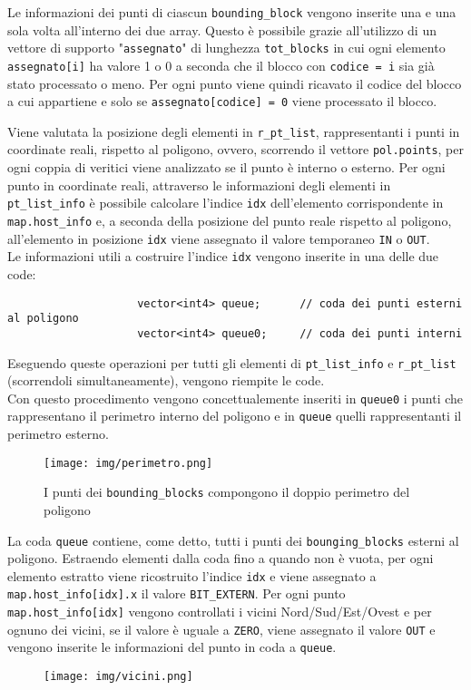 				Le informazioni dei punti di ciascun \texttt{bounding\_block} vengono inserite una e una sola volta all'interno dei due array. Questo \`{e} possibile grazie all'utilizzo di un vettore di supporto "\texttt{assegnato}" di lunghezza \texttt{tot\_blocks} in cui ogni elemento \texttt{assegnato[i]} ha valore 1 o 0 a seconda che il blocco con \texttt{codice = i} sia gi\`{a} stato processato o meno.
				Per ogni punto viene quindi ricavato il codice del blocco a cui appartiene e solo se \texttt{assegnato[codice] = 0} viene processato il blocco.

				Viene valutata la posizione degli elementi in \texttt{r\_pt\_list}, rappresentanti i punti in coordinate reali, rispetto al poligono, ovvero, scorrendo il vettore \texttt{pol.points}, per ogni coppia di veritici viene analizzato se il punto \`{e} interno o esterno. Per ogni punto in coordinate reali, attraverso le informazioni degli elementi in \texttt{pt\_list\_info} \`{e} possibile calcolare l'indice \texttt{idx} dell'elemento corrispondente in \texttt{map.host\_info} e, a seconda della  posizione del punto reale rispetto al poligono, all'elemento in posizione \texttt{idx} viene assegnato il valore temporaneo \texttt{IN} o \texttt{OUT}.\\
				Le informazioni utili a costruire l'indice \texttt{idx} vengono inserite in una delle due code:
				\begin{verbatim}
					vector<int4> queue;      // coda dei punti esterni al poligono
					vector<int4> queue0;     // coda dei punti interni
				\end{verbatim} 
				Eseguendo queste operazioni per tutti gli elementi di \texttt{pt\_list\_info} e \texttt{r\_pt\_list} (scorrendoli simultaneamente), vengono riempite le code.\\
				Con questo procedimento vengono concettualemente inseriti in \texttt{queue0} i punti che rappresentano il perimetro interno del poligono e in \texttt{queue} quelli rappresentanti il perimetro esterno.
				\begin{figure}[htbp]
					\centering
					\texttt{[image: img/perimetro.png]}
					\caption{I punti dei \texttt{bounding\_blocks} compongono il doppio perimetro del poligono}
				\end{figure}
				
				La coda \texttt{queue} contiene, come detto, tutti i punti dei \texttt{bounging\_blocks} esterni al poligono. Estraendo elementi dalla coda fino a quando non \`{e} vuota, per ogni elemento estratto viene ricostruito l'indice \texttt{idx} e viene assegnato a \texttt{map.host\_info[idx].x} il valore \texttt{BIT\_EXTERN}. Per ogni punto \texttt{map.host\_info[idx]} vengono controllati i vicini Nord/Sud/Est/Ovest e per ognuno dei vicini, se il valore \`{e} uguale a \texttt{ZERO}, viene assegnato il valore \texttt{OUT} e vengono inserite le informazioni del punto in coda a \texttt{queue}.
				\begin{figure}[htbp]
					\centering
					\texttt{[image: img/vicini.png]}
				\end{figure}

